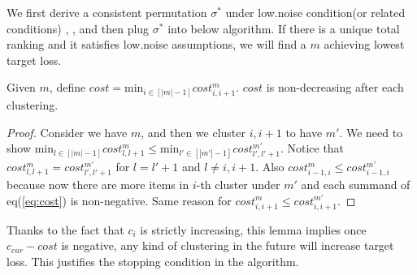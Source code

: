 	We first derive a consistent permutation $\sigma^*$ under low.noise condition(or related conditions) \cite{ramaswamy2013convex}, \cite{duchi2011}, and then plug $\sigma^*$ into below algorithm. If there is a unique total ranking and it satisfies low.noise assumptions, we will find a $m$ achieving lowest target loss.
	
	\begin{lemma}
	Given $m$,  define $cost=\text{min}_{i\in [|m|-1]} cost^m_{i, i+1}$. $cost$ is non-decreasing after each clustering.
	\end{lemma}
\begin{proof}
	Consider we have $m$, and then we cluster $i, i+1$ to have $m'$. We need to show $\text{min}_{l\in [|m|-1]} cost^m_{l, l+1}\leq \text{min}_{l'\in [|m'|-1]} cost^{m'}_{l', l'+1}$. Notice that $cost^m_{l, l+1}=cost^{m'}_{l', l'+1}$ for $l=l'+1$ and $l\not= i, i+1$. Also $cost^m_{i-1, i}\leq cost^{m'}_{i-1, i}$ because now there are more items in $i$-th cluster under $m'$ and each summand  of eq(\ref{eq:cost}) is non-negative. Same reason for $cost^m_{i, i+1}\leq cost^{m'}_{i, i+1}$. 
	\end{proof}
Thanks to the fact that $c_i$ is strictly increasing, this lemma implies once $c_{cur}-cost$ is negative, any kind of clustering in the future will increase target loss. This justifies the stopping condition in the algorithm. 

